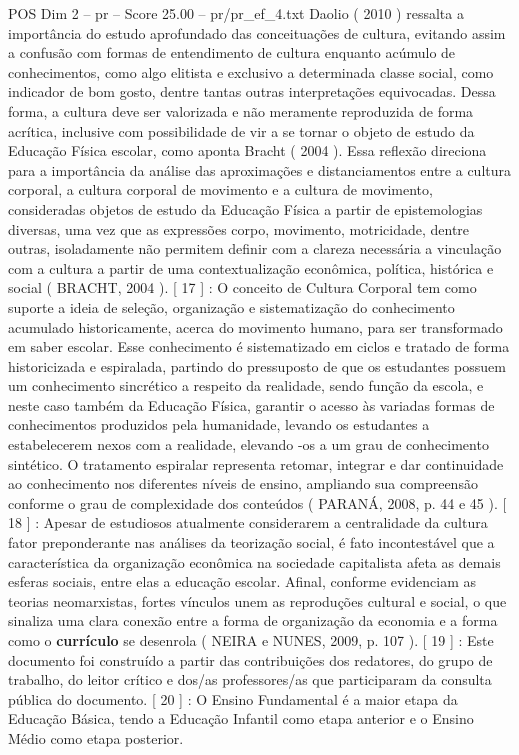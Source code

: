 \begin{textsample}{POS Dim 2 – pr – Score 25.00 – pr/pr\_ef\_4.txt}
Daolio ( 2010 ) ressalta a importância do estudo aprofundado das conceituações de cultura, evitando assim a confusão com formas de entendimento de cultura enquanto acúmulo de conhecimentos, como algo elitista e exclusivo a determinada classe social, como indicador de bom gosto, dentre tantas outras interpretações equivocadas.
Dessa forma, a cultura deve ser valorizada e não meramente reproduzida de forma acrítica, inclusive com possibilidade de vir a se tornar o objeto de estudo da Educação Física escolar, como aponta Bracht ( 2004 ).
Essa reflexão direciona para a importância da análise das aproximações e distanciamentos entre a cultura corporal, a cultura corporal de movimento e a cultura de movimento, consideradas objetos de estudo da Educação Física a partir de epistemologias diversas, uma vez que as expressões corpo, movimento, motricidade, dentre outras, isoladamente não permitem definir com a clareza necessária a vinculação com a cultura a partir de uma contextualização econômica, política, histórica e social ( BRACHT, 2004 ). [ 17 ] : O conceito de Cultura Corporal tem como suporte a ideia de seleção, organização e sistematização do conhecimento acumulado historicamente, acerca do movimento humano, para ser transformado em saber escolar.
Esse conhecimento é sistematizado em ciclos e tratado de forma historicizada e espiralada, partindo do pressuposto de que os estudantes possuem um conhecimento sincrético a respeito da realidade, sendo função da escola, e neste caso também da Educação Física, garantir o acesso às variadas formas de conhecimentos produzidos pela humanidade, levando os estudantes a estabelecerem nexos com a realidade, elevando -os a um grau de conhecimento sintético.
O tratamento espiralar representa retomar, integrar e dar continuidade ao conhecimento nos diferentes níveis de ensino, ampliando sua compreensão conforme o grau de complexidade dos conteúdos ( PARANÁ, 2008, p. 44 e 45 ). [ 18 ] : Apesar de estudiosos atualmente considerarem a centralidade da cultura fator preponderante nas análises da teorização social, é fato incontestável que a característica da organização econômica na sociedade capitalista afeta as demais esferas sociais, entre elas a educação escolar.
Afinal, conforme evidenciam as teorias neomarxistas, fortes vínculos unem as reproduções cultural e social, o que sinaliza uma clara conexão entre a forma de organização da economia e a forma como o \textbf{currículo} se desenrola ( NEIRA e NUNES, 2009, p. 107 ). [ 19 ] : Este documento foi construído a partir das contribuições dos redatores, do grupo de trabalho, do leitor crítico e dos/as professores/as que participaram da consulta pública do documento. [ 20 ] : O Ensino Fundamental é a maior etapa da Educação Básica, tendo a Educação Infantil como etapa anterior e o Ensino Médio como etapa posterior.

\end{textsample}
